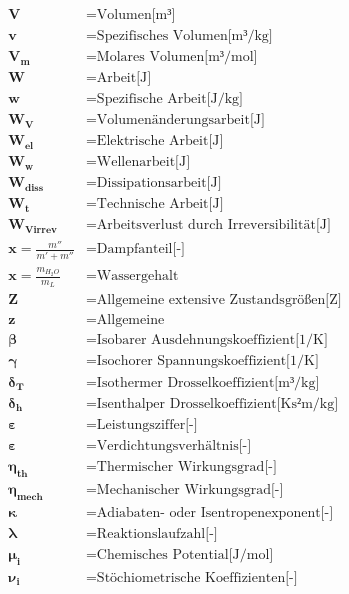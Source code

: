 \documentclass[twocolumn]{article}
\begin{document}
\begin{align*}
	\mathbf{V}		&=	\text{Volumen[m³]} \\
	\mathbf{v}		&=	\text{Spezifisches Volumen[m³/kg]} \\
	\mathbf{V_m}		&=	\text{Molares Volumen[m³/mol]} \\
	\mathbf{W}		&=	\text{Arbeit[J]} \\
	\mathbf{w}		&=	\text{Spezifische Arbeit[J/kg]} \\
	\mathbf{W_V}		&=	\text{Volumenänderungsarbeit[J]} \\
	\mathbf{W_{el}}		&=	\text{Elektrische Arbeit[J]} \\
	\mathbf{W_w}		&=	\text{Wellenarbeit[J]} \\
	\mathbf{W_{diss}}	&=	\text{Dissipationsarbeit[J]} \\
	\mathbf{W_t}		&=	\text{Technische Arbeit[J]} \\
	\mathbf{W_{Virrev}}	&=	\text{Arbeitsverlust durch Irreversibilität[J]} \\
	\mathbf{x}=\frac{m''}{m'+m''}		&=	\text{Dampfanteil[-]} \\
	\mathbf{x}=\frac{m_{H_2O}}{m_L}		&=	\text{Wassergehalt} \\
	\mathbf{Z}		&=	\text{Allgemeine extensive Zustandsgrößen[Z]} \\
	\mathbf{z}		&=	\text{Allgemeine } \\
	\mathbf{\beta}		&=	\text{Isobarer Ausdehnungskoeffizient[1/K]} \\
	\mathbf{\gamma}		&=	\text{Isochorer Spannungskoeffizient[1/K]} \\
	\mathbf{\delta_T}	&=	\text{Isothermer Drosselkoeffizient[m³/kg]} \\
	\mathbf{\delta_h}	&=	\text{Isenthalper Drosselkoeffizient[Ks²m/kg]} \\
	\mathbf{\varepsilon}	&=	\text{Leistungsziffer[-]} \\
	\mathbf{\varepsilon}	&=	\text{Verdichtungsverhältnis[-]} \\
	\mathbf{\eta_{th}}	&=	\text{Thermischer Wirkungsgrad[-]} \\
	\mathbf{\eta_{mech}}	&=	\text{Mechanischer Wirkungsgrad[-]} \\
	\mathbf{\kappa}		&=	\text{Adiabaten- oder Isentropenexponent[-]} \\
	\mathbf{\lambda}	&=	\text{Reaktionslaufzahl[-]} \\
	\mathbf{\mu_i}		&=	\text{Chemisches Potential[J/mol]} \\
	\mathbf{\nu_i}		&=	\text{Stöchiometrische Koeffizienten[-]} \\

\end{align*}
\end{document}
